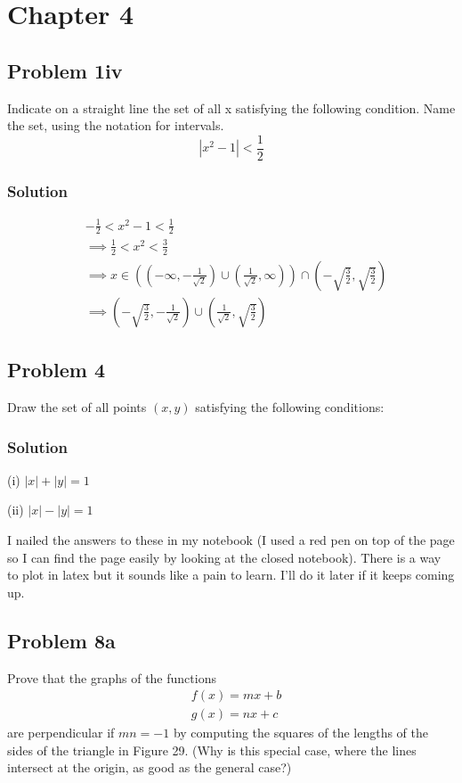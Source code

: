 \section{Chapter 4}
\subsection*{Problem 1iv}
Indicate on a straight line the set of all x satisfying the following condition. Name the set, using the notation for intervals.
\[|x^2-1|<\frac{1}{2}\]

\subsubsection*{Solution}
\begin{align*}
    &-\frac{1}{2}<x^2-1<\frac{1}{2}\\
    &\implies\frac{1}{2}<x^2<\frac{3}{2}\\
    &\implies x\in((-\infty, -\frac{1}{\sqrt{2}})\cup(\frac{1}{\sqrt{2}}, \infty))\cap(-\sqrt{\frac{3}{2}}, \sqrt{\frac{3}{2}})\\
    &\implies (-\sqrt{\frac{3}{2}}, -\frac{1}{\sqrt{2}})\cup(\frac{1}{\sqrt{2}}, \sqrt{\frac{3}{2}})
\end{align*}

\subsection*{Problem 4}
Draw the set of all points $(x,y)$ satisfying the following conditions:

\subsubsection*{Solution}
(i) $|x|+|y|=1$

(ii) $|x|-|y|=1$

\vs

I nailed the answers to these in my notebook (I used a red pen on top of the page so I can find the page easily by looking at the closed notebook). There is a way to plot in latex but it sounds like a pain to learn. I'll do it later if it keeps coming up.

\subsection*{Problem 8a}
Prove that the graphs of the functions
\begin{align*}
    &f(x)=mx+b\\
    &g(x)=nx+c
\end{align*}
are perpendicular if $mn=-1$ by computing the squares of the lengths of the sides of the triangle in Figure 29. (Why is this special case, where the lines intersect at the origin, as good as the general case?)


